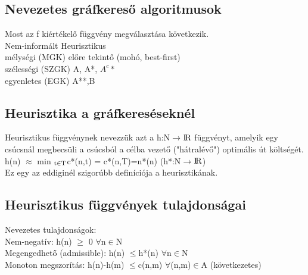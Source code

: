 \documentclass{article}
\begin{document}
	 \subsection{Nevezetes gráfkereső algoritmusok}
	 Most az f kiértékelő függvény megválasztása következik.\\
	 Nem-informált \hspace{10em} Heurisztikus\\
	 mélységi (MGK) \hspace{10em} előre tekintő (mohó, best-first)\\
	 szélességi (SZGK) \hspace{10em} A, A*, $A^c*$\\
	 egyenletes (EGK) \hspace{10em} A**,B\\
	 
	 \subsection{Heurisztika a gráfkereséseknél}
	 Heurisztikus függvénynek nevezzük azt a h:N$\rightarrow$${\rm I\!R}$ függvényt, amelyik egy csúcsnál megbecsüli a csúcsból a célba vezető ("hátralévő") optimális út költségét.\\
	 h(n) $\approx$ min $\textsubscript{t$\in$T}$c*(n,t) = c*(n,T)=n*(n) (h*:N$\rightarrow$${\rm I\!R}$)\\
	 Ez egy az eddiginél szigorúbb definíciója a heurisztikának.\\
	 
	 \subsection{Heurisztikus függvények tulajdonságai}
	 Nevezetes tulajdonságok:\\
	 Nem-negatív: h(n) $\geq$ 0 $\forall$n$\in$N\\
	 Megengedhető (admissible): h(n) $\leq$h*(n) $\forall$n$\in$N\\
	 Monoton megszorítás: h(n)-h(m) $\leq$c(n,m) $\forall$(n,m)$\in$A (következetes)\\
	 
	 \newpage
\end{document}
